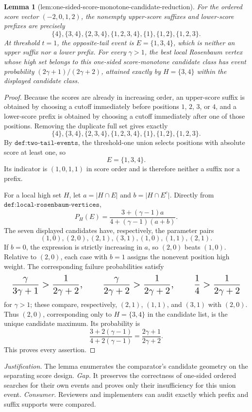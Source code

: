 \documentclass{article}
\newtheorem{lemma}{Lemma}
\begin{document}
\begin{lemma}[lem:one-sided-score-monotone-candidate-reduction]\label{lem:one-sided-score-monotone-candidate-reduction}
For the ordered score vector \((-2,0,1,2)\), the nonempty upper-score suffixes and lower-score prefixes are precisely \[ \{4\},\{3,4\},\{2,3,4\},\{1,2,3,4\},\{1\},\{1,2\},\{1,2,3\}. \] At threshold \(t=1\), the opposite-tail event is \(E=\{1,3,4\}\), which is neither an upper suffix nor a lower prefix. For every \(\gamma>1\), the best local Rosenbaum vertex whose high set belongs to this one-sided score-monotone candidate class has event probability \( (2\gamma+1)/(2\gamma+2)\), attained exactly by \(H=\{3,4\}\) within the displayed candidate class.
\end{lemma}
\begin{proof}
Because the scores are already in increasing order, an upper-score suffix is obtained by choosing a cutoff immediately before positions \(1\), \(2\), \(3\), or \(4\), and a lower-score prefix is obtained by choosing a cutoff immediately after one of those positions. Removing the duplicate full set gives exactly
\[
\{4\},\{3,4\},\{2,3,4\},\{1,2,3,4\},\{1\},\{1,2\},\{1,2,3\}.
\]
By \(\texttt{def:two-tail-events}\), the threshold-one union selects positions with absolute score at least one, so
\[
E=\{1,3,4\}.
\]
Its indicator is \((1,0,1,1)\) in score order and is therefore neither a suffix nor a prefix.

For a local high set \(H\), let \(a=\lvert H\cap E\rvert\) and \(b=\lvert H\cap E^c\rvert\). Directly from \(\texttt{def:local-rosenbaum-vertices}\),
\[
P_H(E)=\frac{3+(\gamma-1)a}{4+(\gamma-1)(a+b)}.
\]
The seven displayed candidates have, respectively, the parameter pairs
\[
(1,0),(2,0),(2,1),(3,1),(1,0),(1,1),(2,1).
\]
If \(b=0\), the expression is strictly increasing in \(a\), so \((2,0)\) beats \((1,0)\). Relative to \((2,0)\), each case with \(b=1\) assigns the nonevent position high weight. The corresponding failure probabilities satisfy
\[
\makebox[\linewidth][c]{\resizebox{0.98\linewidth}{!}{\(\displaystyle \frac{\gamma}{3\gamma+1}>\frac{1}{2\gamma+2},
\qquad
\frac{\gamma}{2\gamma+2}>\frac{1}{2\gamma+2},
\qquad
\frac14>\frac{1}{2\gamma+2}\)}}
\]
for \(\gamma>1\); these compare, respectively, \((2,1)\), \((1,1)\), and \((3,1)\) with \((2,0)\). Thus \((2,0)\), corresponding only to \(H=\{3,4\}\) in the candidate list, is the unique candidate maximum. Its probability is
\[
\frac{3+2(\gamma-1)}{4+2(\gamma-1)}
 =\frac{2\gamma+1}{2\gamma+2}.
\]
This proves every assertion.
\end{proof}
\par\smallskip\noindent \textit{Justification.} The lemma enumerates the comparator's candidate geometry on the separating score design. \textit{Gap.} It preserves the correctness of one-sided ordered searches for their own events and proves only their insufficiency for this union event. \textit{Consumer.} Reviewers and implementers can audit exactly which prefix and suffix supports were compared.
\end{document}
